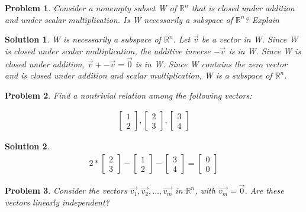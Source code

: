 \documentclass{article}
\newtheorem{problem}{Problem}
\newtheorem*{solution}{Solution}
\begin{document}
\begin{problem}
Consider a nonempty subset W of $\mathbb{R}^n$ that is closed under addition and under scalar multiplication. Is W necessarily a subspace of $\mathbb{R}^n$? Explain
\end{problem}

\begin{solution}
W is necessarily a subspace of $\mathbb{R}^n$. Let $\vec{v}$ be a vector in W. Since W is closed under scalar multiplication, the additive inverse $-\vec{v}$ is in W. Since W is closed under addition, $\vec{v} + -\vec{v} = \vec{0}$ is in W. Since W contains the zero vector and is closed under addition and scalar multiplication, W is a subspace of $\mathbb{R}^n$.
\end{solution}

\begin{problem}
Find a nontrivial relation among the following vectors:

\begin{align*}
\begin{bmatrix}1 \\ 2 \end{bmatrix}, \begin{bmatrix} 2 \\ 3 \end{bmatrix}, \begin{bmatrix}3 \\ 4 \end{bmatrix}
\end{align*}
\end{problem}

\begin{solution}
\begin{align*}
2* \begin{bmatrix} 2 \\ 3 \end{bmatrix} - \begin{bmatrix}1 \\ 2 \end{bmatrix} - \begin{bmatrix}3 \\ 4 \end{bmatrix} = \begin{bmatrix} 0 \\ 0 \end{bmatrix}
\end{align*}
\end{solution}

\begin{problem}
Consider the vectors $\vec{v_{1}}, \vec{v_{2}}, \ldots, \vec{v_{m}}$ in $\mathbb{R}^n$, with $\vec{v_{m}} = \vec{0}$. Are these vectors linearly independent?
\end{problem}
\end{document}
